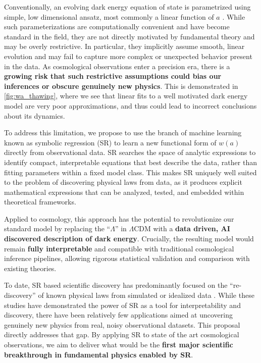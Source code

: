 \documentclass[11pt]{article}
\begin{document}
Conventionally, an evolving dark energy equation of state is parametrized using simple, low dimensional ansatz, most commonly a linear function of $a$ \citep{Chevallier_2000,Linder_2002}. While such parameterizations are computationally convenient and have become standard in the field, they are not directly motivated by fundamental theory and may be overly restrictive. In particular, they implicitly assume smooth, linear evolution and may fail to capture more complex or unexpected behavior present in the data. As cosmological observations enter a precision era, there is a \textbf{growing risk that such restrictive assumptions could bias our inferences or obscure genuinely new physics}.
This is demonstrated in \cref{fig:wa_thawing}, where we see that linear fits to a well motivated dark energy model are very poor approximations, and thus could lead to incorrect conclusions about its dynamics.

To address this limitation, we propose to use the branch of machine learning known as symbolic regression (SR) \citep[for a recent review, see][]{Kronberger_2024} to learn a new functional form of $w(a)$ directly from observational data. SR searches the space of analytic expressions to identify compact, interpretable equations that best describe the data, rather than fitting parameters within a fixed model class. This makes SR uniquely well suited to the problem of discovering physical laws from data, as it produces explicit mathematical expressions that can be analyzed, tested, and embedded within theoretical frameworks.

Applied to cosmology, this approach has the potential to revolutionize our standard model by replacing the ``$\Lambda$'' in $\Lambda$CDM with a \textbf{data driven, AI discovered description of dark energy}. Crucially, the resulting model would remain \textbf{fully interpretable} and compatible with traditional cosmological inference pipelines, allowing rigorous statistical validation and comparison with existing theories.

To date, SR based scientific discovery has predominantly focused on the ``re-discovery'' of known physical laws from simulated or idealized data \citep{Schmidt_2009,Udrescu_2020,Lemos_2023}. While these studies have demonstrated the power of SR as a tool for interpretability and discovery, there have been relatively few applications aimed at uncovering genuinely new physics from real, noisy observational datasets. This proposal directly addresses that gap. By applying SR to state of the art cosmological observations, we aim to deliver what would be the \textbf{first major scientific breakthrough in fundamental physics enabled by SR}.
\end{document}
